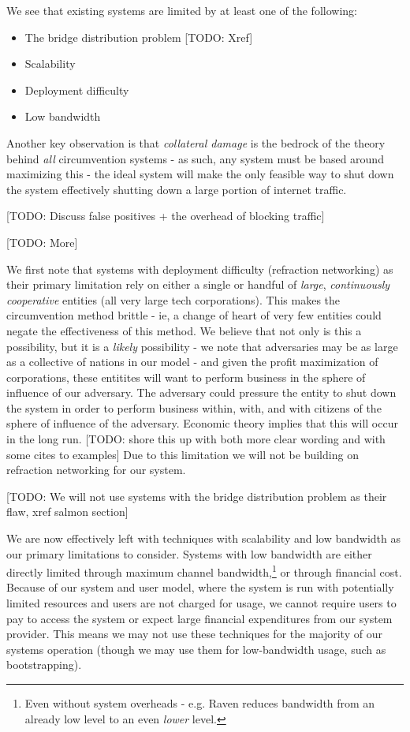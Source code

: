 \documentclass[12pt]{report}
\begin{document}
We see that existing systems are limited by at least one of the following:
\begin{itemize}
  \item The bridge distribution problem [TODO: Xref]
  \item Scalability
  \item Deployment difficulty
  \item Low bandwidth
\end{itemize}

Another key observation is that \emph{collateral damage} is the bedrock of the theory behind \emph{all} circumvention systems - as such, any system must be based around maximizing this - the ideal system will make the only feasible way to shut down the system effectively shutting down a large portion of internet traffic. 

[TODO: Discuss false positives + the overhead of blocking traffic]

[TODO: More]

We first note that systems with deployment difficulty (refraction networking) as their primary limitation rely on either a single or handful of \emph{large}, \emph{continuously cooperative} entities (all very large tech corporations). This makes the circumvention method brittle - ie, a change of heart of very few entities could negate the effectiveness of this method. We believe that not only is this a possibility, but it is a \emph{likely} possibility - we note that adversaries may be as large as a collective of nations in our model - and given the profit maximization of corporations, these entitites will want to perform business in the sphere of influence of our adversary. The adversary could pressure the entity to shut down the system in order to perform business within, with, and with citizens of the sphere of influence of the adversary. Economic theory implies that this will occur in the long run. [TODO: shore this up with both more clear wording and with some cites to examples] Due to this limitation we will not be building on refraction networking for our system.

[TODO: We will not use systems with the bridge distribution problem as their flaw, xref salmon section]

We are now effectively left with techniques with scalability and low bandwidth as our primary limitations to consider. Systems with low bandwidth are either directly limited through maximum channel bandwidth,\footnote{Even without system overheads - e.g. Raven reduces bandwidth from an already low level to an even \emph{lower} level.} or through financial cost. Because of our system and user model, where the system is run with potentially limited resources and users are not charged for usage, we cannot require users to pay to access the system or expect large financial expenditures from our system provider. This means we may not use these techniques for the majority of our systems operation (though we may use them for low-bandwidth usage, such as bootstrapping).
\end{document}
